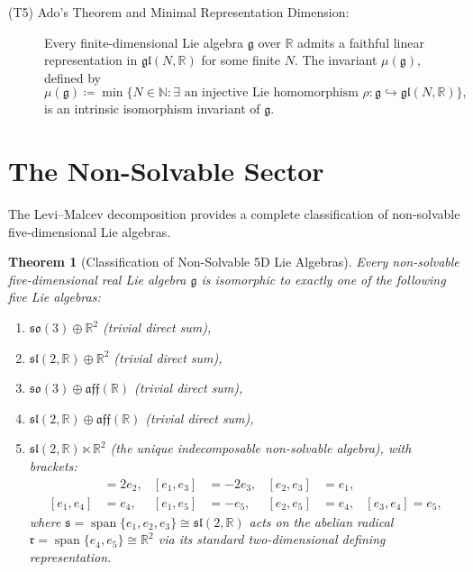 \documentclass[11pt,a4paper]{article}
\newtheorem{theorem}{Theorem}[section]
\theoremstyle{definition}
\theoremstyle{remark}
\newcommand{\R}{\mathbb{R}}
\newcommand{\g}{\mathfrak{g}}
\newcommand{\s}{\mathfrak{s}}
\newcommand{\rr}{\mathfrak{r}}
\newcommand{\spanop}{\operatorname{span}}
\begin{document}
\begin{description}
    \item[(T5) Ado's Theorem and Minimal Representation Dimension:] Every finite-dimensional Lie algebra $\g$ over $\R$ admits a faithful linear representation in $\mathfrak{gl}(N, \R)$ for some finite $N$. The invariant $\mu(\g)$, defined by
    \begin{equation}
        \mu(\g) \coloneqq \min \{ N \in \mathbb{N} : \exists \text{ an injective Lie homomorphism } \rho \colon \g \hookrightarrow \mathfrak{gl}(N, \R) \},
    \end{equation}
    is an intrinsic isomorphism invariant of $\g$.
\end{description}

\section{The Non-Solvable Sector}\label{sec:nonsolv}

The Levi--Malcev decomposition provides a complete classification of non-solvable five-dimensional Lie algebras.

\begin{theorem}[Classification of Non-Solvable 5D Lie Algebras]\label{thm:nonsolv}
Every non-solvable five-dimensional real Lie algebra $\g$ is isomorphic to exactly one of the following five Lie algebras:
\begin{enumerate}
    \item $\mathfrak{so}(3) \oplus \R^2$ (trivial direct sum),
    \item $\mathfrak{sl}(2,\R) \oplus \R^2$ (trivial direct sum),
    \item $\mathfrak{so}(3) \oplus \mathfrak{aff}(\R)$ (trivial direct sum),
    \item $\mathfrak{sl}(2,\R) \oplus \mathfrak{aff}(\R)$ (trivial direct sum),
    \item $\mathfrak{sl}(2,\R) \ltimes \R^2$ (the unique indecomposable non-solvable algebra), with brackets:
    \begin{align}
        [e_1, e_2] &= 2e_2, & [e_1, e_3] &= -2e_3, & [e_2, e_3] &= e_1, \nonumber \\
        [e_1, e_4] &= e_4,  & [e_1, e_5] &= -e_5, & [e_2, e_5] &= e_4, & [e_3, e_4] = e_5,
    \end{align}
    where $\s = \spanop\{e_1, e_2, e_3\} \cong \mathfrak{sl}(2,\R)$ acts on the abelian radical $\rr = \spanop\{e_4, e_5\} \cong \R^2$ via its standard two-dimensional defining representation.
\end{enumerate}
\end{theorem}
\end{document}
